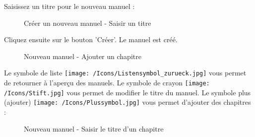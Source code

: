 Saisissez un titre pour le nouveau manuel :

\begin{figure}[H]
\caption{Créer un nouveau manuel - Saisir un titre}
\end{figure}

Cliquez ensuite sur le bouton 'Créer'. Le manuel est créé.

\begin{figure}[H]
\caption{Nouveau manuel - Ajouter un chapitre}
\end{figure}

Le symbole de liste \texttt{[image: /Icons/Listensymbol\_zurueck.jpg]}  vous permet de retourner à l'aperçu des manuels. Le symbole de crayon \texttt{[image: /Icons/Stift.jpg]}  vous permet de modifier le titre du manuel. Le symbole plus (ajouter) \texttt{[image: /Icons/Plussymbol.jpg]}  vous permet d'ajouter des chapitres :

\begin{figure}[H]
\caption{Nouveau manuel - Saisir le titre d'un chapitre}
\end{figure}

